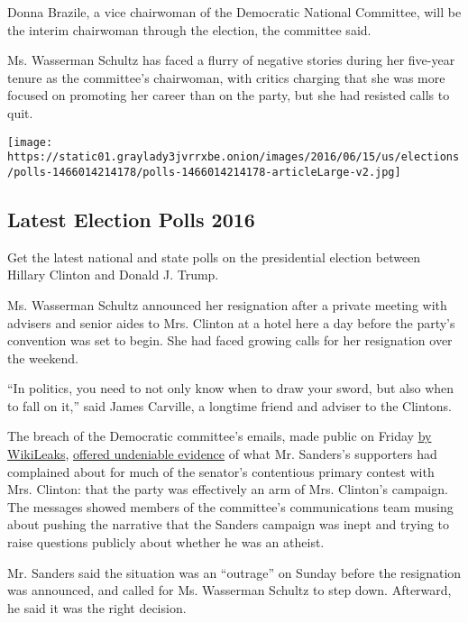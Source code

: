 Donna Brazile, a vice chairwoman of the Democratic National Committee,
will be the interim chairwoman through the election, the committee said.

Ms. Wasserman Schultz has faced a flurry of negative stories during her
five-year tenure as the committee's chairwoman, with critics charging
that she was more focused on promoting her career than on the party, but
she had resisted calls to quit.

\href{https://www.nytimes3xbfgragh.onion/interactive/2016/us/elections/polls.html}{}

\texttt{[image: https://static01.graylady3jvrrxbe.onion/images/2016/06/15/us/elections/polls-1466014214178/polls-1466014214178-articleLarge-v2.jpg]}

\hypertarget{latest-election-polls-2016}{%
\subsection{Latest Election Polls
2016}\label{latest-election-polls-2016}}

Get the latest national and state polls on the presidential election
between Hillary Clinton and Donald J. Trump.

Ms. Wasserman Schultz announced her resignation after a private meeting
with advisers and senior aides to Mrs. Clinton at a hotel here a day
before the party's convention was set to begin. She had faced growing
calls for her resignation over the weekend.

``In politics, you need to not only know when to draw your sword, but
also when to fall on it,'' said James Carville, a longtime friend and
adviser to the Clintons.

The breach of the Democratic committee's emails, made public on Friday
\href{https://wikileaks.com/dnc-emails/}{by WikiLeaks},
\href{http://www.nytimes3xbfgragh.onion/2016/07/23/us/politics/dnc-emails-sanders-clinton.html}{offered
undeniable evidence} of what Mr. Sanders's supporters had complained
about for much of the senator's contentious primary contest with Mrs.
Clinton: that the party was effectively an arm of Mrs. Clinton's
campaign. The messages showed members of the committee's communications
team musing about pushing the narrative that the Sanders campaign was
inept and trying to raise questions publicly about whether he was an
atheist.

Mr. Sanders said the situation was an ``outrage'' on Sunday before the
resignation was announced, and called for Ms. Wasserman Schultz to step
down. Afterward, he said it was the right decision.


